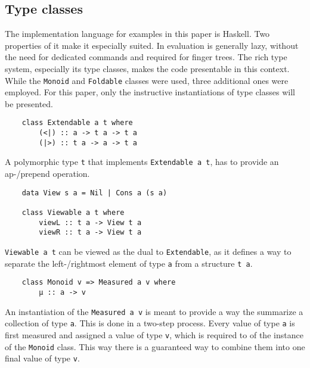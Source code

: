 \subsection{Type classes}

The implementation language for examples in this paper is Haskell. Two properties of it make it especially suited. In evaluation is generally lazy, without the need for dedicated commands and required for finger trees. The rich type system, especially its type classes, makes the code presentable in this context.\\
While the \texttt{Monoid} and \texttt{Foldable} classes were used, three additional ones were employed. For this paper, only the instructive instantiations of type classes will be presented.

\begin{verbatim}
    class Extendable a t where
        (<|) :: a -> t a -> t a 
        (|>) :: t a -> a -> t a
\end{verbatim}

A polymorphic type \texttt{t} that implements \texttt{Extendable a t}, has to provide an ap-/prepend operation.

\begin{verbatim}
    data View s a = Nil | Cons a (s a)

    class Viewable a t where
        viewL :: t a -> View t a
        viewR :: t a -> View t a
\end{verbatim}

\texttt{Viewable a t} can be viewed as the dual to \texttt{Extendable}, as it defines a way to separate the left-/rightmost element of type \texttt{a} from a structure \texttt{t a}.

\begin{verbatim}
    class Monoid v => Measured a v where
        μ :: a -> v
\end{verbatim}

An instantiation of the \texttt{Measured a v} is meant to provide a way  the summarize a collection of type \texttt{a}. This is done in a two-step process. Every value of type \texttt{a} is first measured and assigned a value of type \texttt{v}, which is required to of the instance of the \texttt{Monoid} class. This way there is a guaranteed way to combine them into one final value of type \texttt{v}.

